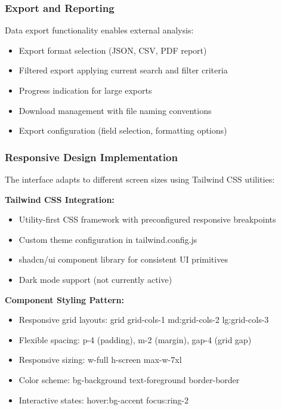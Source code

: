 \subsubsection{Export and Reporting}

Data export functionality enables external analysis:

\begin{itemize}
    \item Export format selection (JSON, CSV, PDF report)
    \item Filtered export applying current search and filter criteria
    \item Progress indication for large exports
    \item Download management with file naming conventions
    \item Export configuration (field selection, formatting options)
\end{itemize}

\subsubsection{Responsive Design Implementation}

The interface adapts to different screen sizes using Tailwind CSS utilities:

\textbf{Tailwind CSS Integration:}
\begin{itemize}
    \item Utility-first CSS framework with preconfigured responsive breakpoints
    \item Custom theme configuration in tailwind.config.js
    \item shadcn/ui component library for consistent UI primitives
    \item Dark mode support (not currently active)
\end{itemize}

\textbf{Component Styling Pattern:}
\begin{itemize}
    \item Responsive grid layouts: grid grid-cols-1 md:grid-cols-2 lg:grid-cols-3
    \item Flexible spacing: p-4 (padding), m-2 (margin), gap-4 (grid gap)
    \item Responsive sizing: w-full h-screen max-w-7xl
    \item Color scheme: bg-background text-foreground border-border
    \item Interactive states: hover:bg-accent focus:ring-2
\end{itemize}

